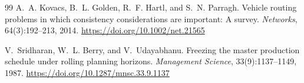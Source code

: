 \begin{thebibliography}{99}
A.~A. Kovacs, B.~L. Golden, R.~F. Hartl, and S.~N. Parragh.
\newblock Vehicle routing problems in which consistency considerations are important: A survey.
\newblock \emph{Networks}, 64(3):192--213, 2014.
\newblock \url{https://doi.org/10.1002/net.21565}

V.~Sridharan, W.~L. Berry, and V.~Udayabhanu.
\newblock Freezing the master production schedule under rolling planning horizons.
\newblock \emph{Management Science}, 33(9):1137--1149, 1987.
\newblock \url{https://doi.org/10.1287/mnsc.33.9.1137}

\end{thebibliography}

